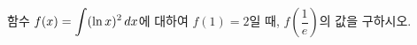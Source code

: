함수 $f(x)=\displaystyle\int (\ln x)^2\mkern3mu dx$에 대하여 $f(1)=2$일 때, $f\left(\dfrac{1}{e}\right)$의 값을 구하시오.

